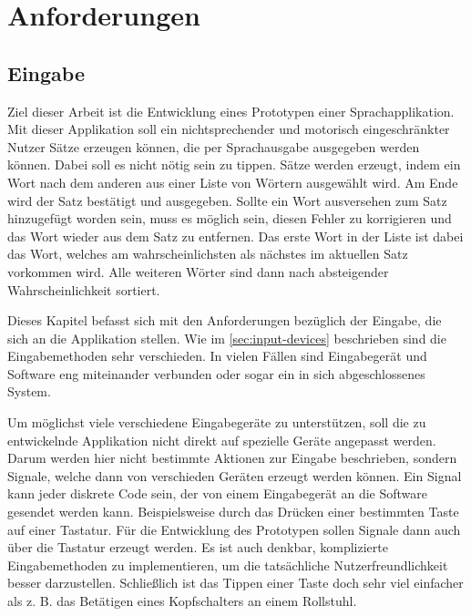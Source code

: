 \section{Anforderungen}
    
	\subsection{Eingabe}
 
    	Ziel dieser Arbeit ist die Entwicklung eines Prototypen einer Sprachapplikation. Mit dieser Applikation soll ein nichtsprechender und motorisch eingeschränkter Nutzer Sätze erzeugen können, die per Sprachausgabe ausgegeben werden können. Dabei soll es nicht nötig sein zu tippen. Sätze werden erzeugt, indem ein Wort nach dem anderen aus einer Liste von Wörtern ausgewählt wird. Am Ende wird der Satz bestätigt und ausgegeben. Sollte ein Wort ausversehen zum Satz hinzugefügt worden sein, muss es möglich sein, diesen Fehler zu korrigieren und das Wort wieder aus dem Satz zu entfernen. Das erste Wort in der Liste ist dabei das Wort, welches am wahrscheinlichsten als nächstes im aktuellen Satz vorkommen wird. Alle weiteren Wörter sind dann nach absteigender Wahrscheinlichkeit sortiert.
         
    	Dieses Kapitel befasst sich mit den Anforderungen bezüglich der Eingabe, die sich an die Applikation stellen. Wie im \autoref{sec:input-devices} beschrieben sind die Eingabemethoden sehr verschieden. In vielen Fällen sind Eingabegerät und Software eng miteinander verbunden oder sogar ein in sich abgeschlossenes System.
        
        Um möglichst viele verschiedene Eingabegeräte zu unterstützen, soll die zu entwickelnde Applikation nicht direkt auf spezielle Geräte angepasst werden. Darum werden hier nicht bestimmte Aktionen zur Eingabe beschrieben, sondern Signale, welche dann von verschieden Geräten erzeugt werden können. Ein Signal kann jeder diskrete Code sein, der von einem Eingabegerät an die Software gesendet werden kann. Beispielsweise durch das Drücken einer bestimmten Taste auf einer Tastatur. Für die Entwicklung des Prototypen sollen Signale dann auch über die Tastatur erzeugt werden. Es ist auch denkbar, komplizierte Eingabemethoden zu implementieren, um die tatsächliche Nutzerfreundlichkeit besser darzustellen. Schließlich ist das Tippen einer Taste doch sehr viel einfacher als z. B. das Betätigen eines Kopfschalters an einem Rollstuhl. 
        
